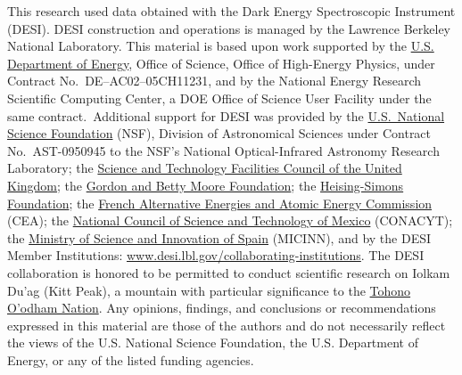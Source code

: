 \documentclass[fleqn,usenatbib]{mnras}
\begin{document}
This research used data obtained with the Dark Energy Spectroscopic Instrument (DESI).
DESI construction and operations is managed by the Lawrence Berkeley National Laboratory.
This material is based upon work supported by the \href{https://www.energy.gov/}{U.S. Department of Energy}, Office of Science, Office of High-Energy Physics, under Contract No.\ DE–AC02–05CH11231, and by the National Energy Research Scientific Computing Center, a DOE Office of Science User Facility under the same contract.\
Additional support for DESI was provided by the \href{https://www.nsf.gov/}{U.S.\ National Science Foundation} (NSF), Division of Astronomical Sciences under Contract No.\ AST-0950945 to the NSF’s National Optical-Infrared Astronomy Research Laboratory;
the \href{https://stfc.ukri.org/}{Science and Technology Facilities Council of the United Kingdom};
the \href{https://www.moore.org/}{Gordon and Betty Moore Foundation};
the \href{https://www.hsfoundation.org/}{Heising-Simons Foundation};
the \href{http://www.cea.fr/}{French Alternative Energies and Atomic Energy Commission} (CEA);
the \href{https://www.conacyt.gob.mx/}{National Council of Science and Technology of Mexico} (CONACYT);
the \href{http://www.mineco.gob.es/}{Ministry of Science and Innovation of Spain} (MICINN), and by the DESI Member Institutions: \url{www.desi.lbl.gov/collaborating-institutions}.
The DESI collaboration is honored to be permitted to conduct scientific research on Iolkam Du’ag (Kitt Peak), a mountain with particular significance to the \href{http://www.tonation-nsn.gov/}{Tohono O’odham Nation}.
Any opinions, findings, and conclusions or recommendations expressed in this material are those of the authors and do not necessarily reflect the views of the U.S. National Science Foundation, the U.S. Department of Energy, or any of the listed funding agencies.
\end{document}
